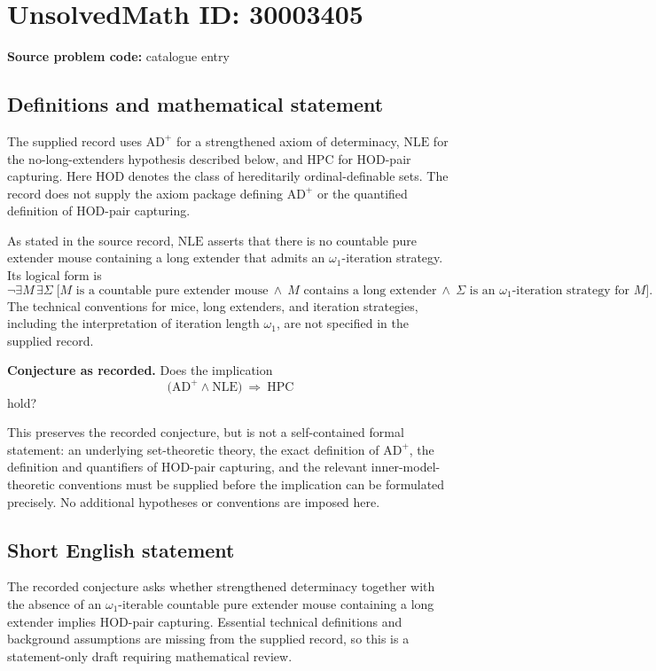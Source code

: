 \documentclass[11pt]{article}
\begin{document}
\section*{UnsolvedMath ID: 30003405}
\textbf{Source problem code:} catalogue entry
\subsection{Definitions and mathematical statement}
The supplied record uses \(\mathrm{AD}^{+}\) for a strengthened axiom of determinacy, \(\mathrm{NLE}\) for the no-long-extenders hypothesis described below, and \(\mathrm{HPC}\) for HOD-pair capturing. Here HOD denotes the class of hereditarily ordinal-definable sets. The record does not supply the axiom package defining \(\mathrm{AD}^{+}\) or the quantified definition of HOD-pair capturing.

As stated in the source record, \(\mathrm{NLE}\) asserts that there is no countable pure extender mouse containing a long extender that admits an \(\omega_1\)-iteration strategy. Its logical form is
\[
\neg\exists M\,\exists\Sigma\;\bigl[
M\text{ is a countable pure extender mouse}
\ \land\ M\text{ contains a long extender}
\ \land\ \Sigma\text{ is an }\omega_1\text{-iteration strategy for }M
\bigr].
\]
The technical conventions for mice, long extenders, and iteration strategies, including the interpretation of iteration length \(\omega_1\), are not specified in the supplied record.

\textbf{Conjecture as recorded.} Does the implication
\[
\bigl(\mathrm{AD}^{+}\land\mathrm{NLE}\bigr)
\ \Longrightarrow\ \mathrm{HPC}
\]
hold?

This preserves the recorded conjecture, but is not a self-contained formal statement: an underlying set-theoretic theory, the exact definition of \(\mathrm{AD}^{+}\), the definition and quantifiers of HOD-pair capturing, and the relevant inner-model-theoretic conventions must be supplied before the implication can be formulated precisely. No additional hypotheses or conventions are imposed here.
\subsection{Short English statement}
The recorded conjecture asks whether strengthened determinacy together with the absence of an \(\omega_1\)-iterable countable pure extender mouse containing a long extender implies HOD-pair capturing. Essential technical definitions and background assumptions are missing from the supplied record, so this is a statement-only draft requiring mathematical review.
\end{document}
